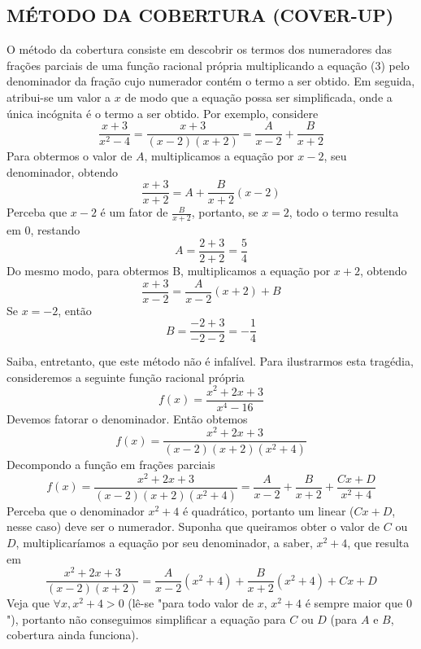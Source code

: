 \documentclass[a4paper, 12pt]{extreport}
\begin{document}
        \subsection*{\color{coverup}\small MÉTODO DA COBERTURA (COVER-UP)}
          O método da cobertura consiste em descobrir os termos dos numeradores das frações parciais de uma função racional própria multiplicando
          a equação (3) pelo denominador da fração cujo numerador contém o termo a ser obtido. Em seguida, atribui-se um valor a $x$ de modo que
          a equação possa ser simplificada, onde a única incógnita é o termo a ser obtido.
          Por exemplo, considere $$ \frac{x+3}{x^2-4} = \frac{x+3}{(x-2)(x+2)} = \frac{A}{x-2} + \frac{B}{x+2} $$
          Para obtermos o valor de $A$, multiplicamos a equação por $x-2$, seu denominador, obtendo
          $$ \frac{x+3}{x+2} = A + \frac{B}{x+2}(x-2) $$
          Perceba que $x-2$ é um fator de {\large$\frac{B}{x+2}$}, portanto, se $x=2$, todo o termo resulta em $0$, restando
          $$ A = \frac{2+3}{2+2} = \frac{5}{4} $$
          Do mesmo modo, para obtermos B, multiplicamos a equação por $x+2$, obtendo
          $$ \frac{x+3}{x-2} = \frac{A}{x-2}(x+2) + B $$
          Se $x = -2$, então
          $$ B = \frac{-2+3}{-2-2} = -\frac{1}{4} $$

          Saiba, entretanto, que este método não é infalível. Para ilustrarmos esta tragédia, consideremos a seguinte função racional própria
          $$ f(x) = \frac{x^2+2x+3}{x^4-16} $$
          Devemos fatorar o denominador. Então obtemos
          $$ f(x) = \frac{x^2+2x+3}{(x-2)(x+2)(x^2+4)} $$
          \vspace{1mm}
          Decompondo a função em frações parciais
          $$ f(x) = \frac{x^2+2x+3}{(x-2)(x+2)(x^2+4)} = \frac{A}{x-2} + \frac{B}{x+2} + \frac{Cx+D}{x^2+4} $$
          \vspace{1mm}
          Perceba que o denominador $x^2+4$ é quadrático, portanto um linear ($Cx+D$, nesse caso) deve ser o numerador.
          Suponha que queiramos obter o valor de $C$ ou $D$, multiplicaríamos a equação por seu denominador, a saber, $x^2+4$, que resulta em
          $$ \frac{x^2+2x+3}{(x-2)(x+2)} = \frac{A}{x-2}(x^2+4) + \frac{B}{x+2}(x^2+4) + Cx+D $$
          \vspace{1mm}
          Veja que $\forall x, x^2+4 > 0$ (lê-se "para todo valor de $x$, $x^2+4$ é sempre maior que $0$"), portanto não conseguimos simplificar a
          equação para $C$ ou $D$ (para $A$ e $B$, cobertura ainda funciona).
\end{document}
